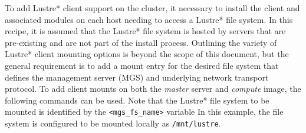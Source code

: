 To add Lustre* client support on the cluster, it necessary to install the client
and associated modules on each host needing to access a Lustre* file system.  In
this recipe, it is assumed that the Lustre* file system is hosted by servers
that are pre-existing and are not part of the install process. Outlining the
variety of Lustre* client mounting options is beyond the scope of this document,
but the general requirement is to add a mount entry for the desired file system
that defines the management server (MGS) and underlying network transport
protocol.  To add client mounts on both the {\em master} server and {\em
compute} image, the following commands can be used. Note that the Lustre* file
system to be mounted is identified by the \texttt{<mgs\_fs\_name>} variable 
In this example, the file system is configured to be mounted locally
as \texttt{/mnt/lustre}.
